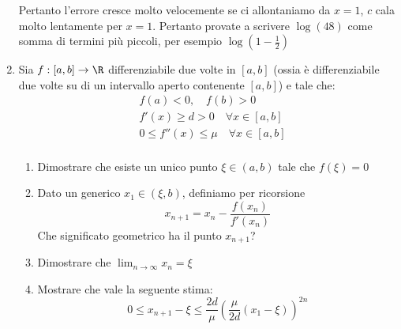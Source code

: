 \begin{enumerate}
{{\[			      \]
			      Pertanto l'errore cresce molto velocemente se ci allontaniamo da $ x=1 $, $ c $ cala molto lentamente per $ x=1 $. Pertanto provate a scrivere $ \log \left(48\right) $ come somma di termini più piccoli, per esempio $ \log \left(1 - \frac{1}{2}\right) $
		      }
	      }
	\item Sia $ f : \left[a,b\right] \rightarrow \R  $ differenziabile due volte in $ \left[a,b\right] $ (ossia è differenziabile due volte su di un intervallo aperto contenente $ \left[a,b\right] $) e tale che:
	      \begin{align*}
		       & f\left(a\right) < 0, \quad f\left(b\right) > 0                     \\
		       & f'\left(x\right) \ge d > 0  \quad  \forall  x \in \left[a,b\right] \\
		       & 0 \le  f''(x) \le \mu \quad \forall  x \in \left[a,b\right]        \\
	      \end{align*}
	      \begin{enumerate}
		      \item Dimostrare che esiste un unico punto $ \xi \in  \left(a,b\right) $ tale che $ f\left(\xi  \right)= 0 $
		      \item Dato un generico $ x_1 \in  \left(\xi  ,b\right) $, definiamo per ricorsione
		            \[
			            x_{n+1} = x_n - \frac{f\left(x_n\right)}{f'\left(x_n\right)}
		            \]
		            Che significato geometrico ha il punto $ x_{n+1} $?
		      \item Dimostrare che $ \lim_{n \to \infty} x_n = \xi  $
		      \item Mostrare che vale la seguente stima:
		            \[
			            0 \le  x_{n +1} - \xi \le  \frac{2d }{\mu } \left(\frac{\mu}{2d } \left(x_1 - \xi \right)\right)^{2n}
		            \]
	      \end{enumerate}
\end{enumerate}
